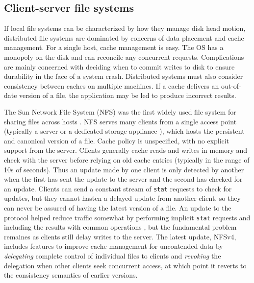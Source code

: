 \subsection{Client-server file systems}

If local file systems can be characterized by how they manage disk head motion, distributed file systems are dominated by concerns of data placement and cache management. For a single host, cache management is easy. The OS has a monopoly on the disk and can reconcile any concurrent requests. Complications are mainly concerned with deciding when to commit writes to disk to ensure durability in the face of a system crash. Distributed systems must also consider consistency between caches on multiple machines. If a cache delivers an out-of-date version of a file, the application may be led to produce incorrect results.

The Sun Network File System (NFS) was the first widely used file system for sharing files across hosts \cite{sandberg}. NFS serves many clients from a single access point (typically a server or a dedicated storage appliance \cite{hitz}), which hosts the persistent and canonical version of a file. Cache policy is unspecified, with no explicit support from the server. Clients generally cache reads and writes in memory and check with the server before relying on old cache entries (typically in the range of 10s of seconds). Thus an update made by one client is only detected by another when the first has sent the update to the server and the second has checked for an update. Clients can send a constant stream of \texttt{stat} requests to check for updates, but they cannot hasten a delayed update from another client, so they can never be assured of having the latest version of a file. An update to the protocol helped reduce traffic somewhat by performing implicit \texttt{stat} requests and including the results with common operations \cite{pawlowski,callaghan}, but the fundamental problem remaines as clients still delay writes to the server. The latest update, NFSv4, includes features to improve cache management for uncontended data by \emph{delegating} complete control of individual files to clients and \emph{revoking} the delegation when other clients seek concurrent access, at which point it reverts to the consistency semantics of earlier versions.


